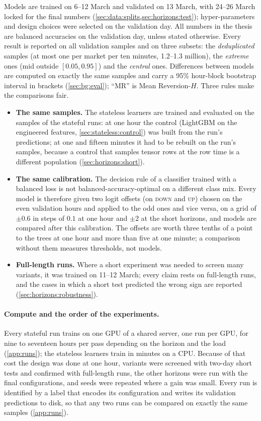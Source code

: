 Models are trained on 6--12 March and validated on 13 March, with 24--26 March locked for
the final numbers (\cref{sec:data:splits,sec:horizons:test}); hyper-parameters and design
choices were selected on the validation day.  All numbers in the thesis are balanced
accuracies \cite{brodersen2010balanced} on the validation day, unless stated otherwise.
Every result is reported on all validation samples and on three subsets: the
\emph{deduplicated} samples (at most one per market per ten minutes, 1.2--1.3 million), the
\emph{extreme} ones (mid outside $[0.05, 0.95]$) and the \emph{central} ones.  Differences
between models are computed on exactly the same samples and carry a 95\% hour-block
bootstrap interval in brackets (\cref{sec:bg:eval}); ``MR'' is Mean Reversion-$H$.  Three
rules make the comparisons fair.
\begin{itemize}[nosep]
  \item \textbf{The same samples.}  The stateless learners are trained and evaluated on the
  samples of the stateful runs: at one hour the control (LightGBM on the engineered features,
  \cref{sec:stateless:control}) was built from the run's predictions;
  at one and fifteen minutes it had to be rebuilt on the run's samples, because a control
  that samples tensor rows at the row time is a different population
  (\cref{sec:horizons:short}).
  \item \textbf{The same calibration.}  The decision rule of a classifier trained with a
  balanced loss is not balanced-accuracy-optimal on a different class mix.  Every model is
  therefore given two logit offsets (on \textsc{down} and \textsc{up}) chosen on the even
  validation hours and applied to the odd ones and vice versa, on a grid of $\pm 0.6$ in
  steps of $0.1$ at one hour and $\pm 2$ at the short horizons, and models are compared
  after this calibration.  The offsets are worth three tenths of a point to the trees at one
  hour and more than five at one minute; a comparison without them measures thresholds, not
  models.
  \item \textbf{Full-length runs.}  Where a short experiment was needed to screen many
  variants, it was trained on 11--12 March; every claim rests on full-length runs, and the
  cases in which a short test predicted the wrong sign are reported
  (\cref{sec:horizons:robustness}).
\end{itemize}

\paragraph{Compute and the order of the experiments.}  Every stateful run trains on one
GPU of a shared server, one run per GPU, for nine to seventeen hours per pass depending on
the horizon and the load (\cref{app:runs}); the stateless learners train in minutes on a CPU.
Because of that cost the design was done at one hour, variants were screened with two-day
short tests and confirmed with full-length runs, the other horizons were run with the final
configurations, and seeds were repeated where a gain was small.  Every run is identified by
a label that encodes its configuration and writes its validation predictions to disk, so
that any two runs can be compared on exactly the same samples (\cref{app:runs}).

